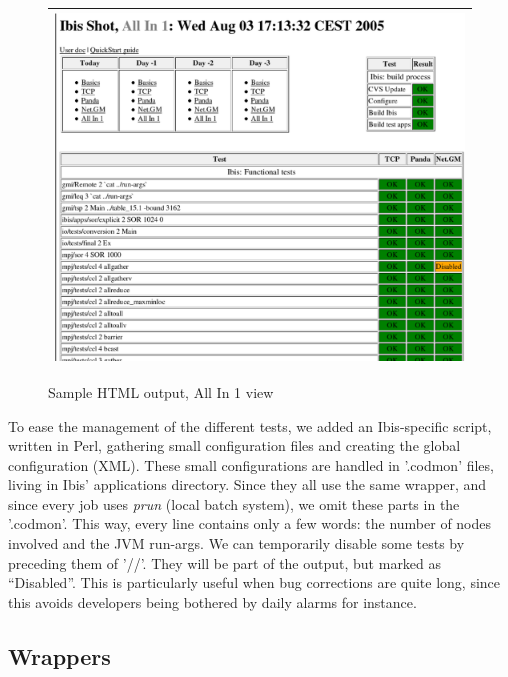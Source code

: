\documentclass[a4paper,10pt]{article}
\renewcommand{\|}{\url|}
\begin{document}
\begin{figure}
  \begin{center}
    \begin{tabular}{|c|} \hline
      \includegraphics[width=\textwidth]{html2}\\
      \hline
    \end{tabular}
  \end{center}
  \caption{Sample HTML output, All In 1 view}
  \label{fig:html2}
\end{figure}


To ease the management of the different tests, we added an Ibis-specific script, written in Perl, gathering small configuration files and creating the global configuration (XML). These small configurations are handled in '.codmon' files, living in Ibis' applications directory. Since they all use the same wrapper, and since every job uses \emph{prun} (local batch system), we omit these parts in the '.codmon'. This way, every line contains only a few words: the number of nodes involved and the JVM run-args. We can temporarily disable some tests by preceding them of '//'. They will be part of the output, but marked as ``Disabled''. This is particularly useful when bug corrections are quite long, since this avoids developers being bothered by daily alarms for instance.

\subsection{Wrappers}
\end{document}
